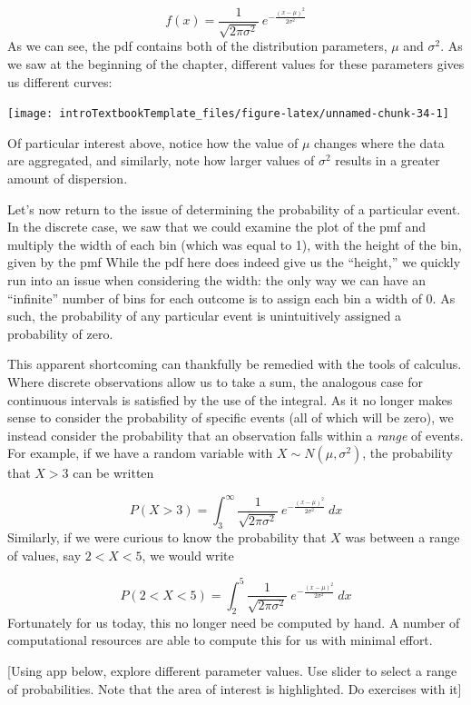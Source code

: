 \documentclass[
]{book}
\theoremstyle{definition}
\theoremstyle{definition}
\theoremstyle{definition}
\theoremstyle{remark}
\begin{document}
\[
f(x) = \frac{1}{\sqrt{2\pi \sigma^2}} \ e^{- \frac{(x-\mu)^2}{2\sigma^2}}
\]
As we can see, the pdf contains both of the distribution parameters, \(\mu\) and \(\sigma^2\). As we saw at the beginning of the chapter, different values for these parameters gives us different curves:

\begin{center}\texttt{[image: introTextbookTemplate\_files/figure-latex/unnamed-chunk-34-1]} \end{center}

Of particular interest above, notice how the value of \(\mu\) changes where the data are aggregated, and similarly, note how larger values of \(\sigma^2\) results in a greater amount of dispersion.

Let's now return to the issue of determining the probability of a particular event. In the discrete case, we saw that we could examine the plot of the pmf and multiply the width of each bin (which was equal to 1), with the height of the bin, given by the pmf While the pdf here does indeed give us the ``height,'' we quickly run into an issue when considering the width: the only way we can have an ``infinite'' number of bins for each outcome is to assign each bin a width of 0. As such, the probability of any particular event is unintuitively assigned a probability of zero.

This apparent shortcoming can thankfully be remedied with the tools of calculus. Where discrete observations allow us to take a sum, the analogous case for continuous intervals is satisfied by the use of the integral. As it no longer makes sense to consider the probability of specific events (all of which will be zero), we instead consider the probability that an observation falls within a \emph{range} of events. For example, if we have a random variable with \(X \sim N(\mu, \sigma^2)\), the probability that \(X > 3\) can be written

\[
P(X > 3) = \int_3^{\infty} \frac{1}{\sqrt{2\pi \sigma^2}} \ e^{- \frac{(x-\mu)^2}{2\sigma^2}} \ dx
\]
Similarly, if we were curious to know the probability that \(X\) was between a range of values, say \(2 < X < 5\), we would write

\[
P(2 < X < 5) = \int_2^{5} \frac{1}{\sqrt{2\pi \sigma^2}} \ e^{- \frac{(x-\mu)^2}{2\sigma^2}} \ dx
\]
Fortunately for us today, this no longer need be computed by hand. A number of computational resources are able to compute this for us with minimal effort.

{[}Using app below, explore different parameter values. Use slider to select a range of probabilities. Note that the area of interest is highlighted. Do exercises with it{]}
\end{document}

